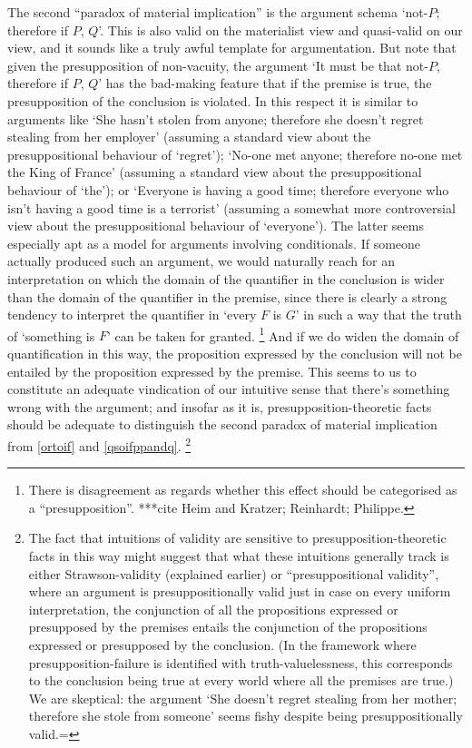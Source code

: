 \documentclass[If.tex]{subfiles}
\begin{document}
\begin{prop}
The second “paradox of material implication” is the argument schema ‘not-$P$; therefore if $P$, $Q$’. This is also valid on the materialist view and quasi-valid on our view, and it sounds like a truly awful template for argumentation. But note that given the presupposition of non-vacuity, the argument ‘It must be that not-$P$, therefore if $P$, $Q$’ has the bad-making feature that if the premise is true, the presupposition of the conclusion is violated. In this respect it is similar to arguments like ‘She hasn't stolen from anyone; therefore she doesn't regret stealing from her employer’ (assuming a standard view about the presuppositional behaviour of ‘regret’); ‘No-one met anyone; therefore no-one met the King of France’ (assuming a standard view about the presuppositional behaviour of ‘the’); or ‘Everyone is having a good time; therefore everyone who isn't having a good time is a terrorist’ (assuming a somewhat more controversial view about the presuppositional behaviour of ‘everyone’). The latter seems especially apt as a model for arguments involving conditionals.  If someone actually produced such an argument, we would naturally reach for an interpretation on which the domain of the quantifier in the conclusion is wider than the domain of the quantifier in the premise, since there is clearly a strong tendency to interpret the quantifier in ‘every $F$ is $G$’ in such a way that the truth of ‘something is $F$’ can be taken for granted.%
\footnote{There is disagreement as regards whether this effect should be categorised as a “presupposition”.  ***cite Heim and Kratzer; Reinhardt; Philippe.  }
And if we do widen the domain of quantification in this way, the proposition expressed by the conclusion will not be entailed by the proposition expressed by the premise.  This seems to us to constitute an adequate vindication of our intuitive sense that there's something wrong with the argument; and insofar as it is, presupposition-theoretic facts should be adequate to distinguish the second paradox of material implication from \ref{ortoif} and \ref{qsoifppandq}.%
\footnote{The fact that intuitions of validity are sensitive to presupposition-theoretic facts in this way might suggest that what these intuitions generally track is either Strawson-validity (explained earlier) or “presuppositional validity”, where an argument is presuppositionally valid just in case on every uniform interpretation, the conjunction of all the propositions expressed or presupposed by the premises entails the conjunction of the propositions expressed or presupposed by the conclusion.  (In the framework where presupposition-failure is identified with truth-valuelessness, this corresponds to the conclusion being true at every world where all the premises are true.)  We are skeptical: the argument ‘She doesn't regret stealing from her mother; therefore she stole from someone’ seems fishy despite being presuppositionally valid.=}  


\end{prop}
\end{document}
